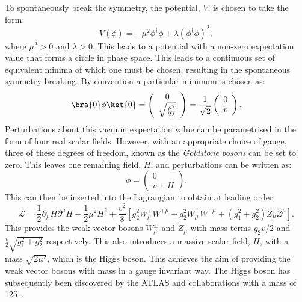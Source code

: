 To spontaneously break the symmetry, the potential, $V$, is chosen to
take the form:
\begin{equation}
\label{eq:higgsPot}
V(\phi)=-\mu^{2}\phi^{\dag}\phi+\lambda\left(\phi^{\dag}\phi\right)^{2},
\end{equation}
where $\mu^2>0$ and $\lambda>0$. This leads to a potential with a
non-zero expectation value that forms a circle in phase space. This
leads to a continuous set of equivalent minima of which one must be
chosen, resulting in the spontaneous symmetry breaking. By convention a
particular minimum is chosen as:
\begin{equation}
\bra{0}\phi\ket{0}=\left(\begin{array}{c} 0 \\ \sqrt{\frac{\mu^{2}}{2\lambda}} \end{array}\right)=\frac{1}{\sqrt{2}}\left(\begin{array}{c} 0 \\ v \end{array}\right).
\end{equation}
Perturbations about this vacuum expectation value can be parametrised
in the form of four real scalar fields. However, with an appropriate
choice of gauge, three of these degrees of freedom, known as the
\emph{Goldstone bosons} can be set to zero. This leaves one remaining
field, $H$, and perturbations can be written as:
\begin{equation}
  \phi=\left(\begin{array}{c}0 \\ v+H \end{array}\right).
\end{equation}
This can then be inserted into the Lagrangian to obtain at leading
order:
\begin{equation}
  \mathcal{L}=\frac{1}{2}\partial_{\mu}H\partial^{\mu}H-\frac{1}{2}\mu^{2}H^{2}+\frac{v^{2}}{8}\left[g_{2}^{2}W_{\mu}^{+}W^{+\mu}+g_{2}^{2}W_{\mu}^{-}W^{-\mu}+\left(g_{1}^{2}+g_{2}^{2}\right)Z_{\mu}Z^{\mu}\right].
\end{equation}
This provides the weak vector bosons $W_{\mu}^{\pm}$ and $Z_{\mu}$
with mass terms $g_2v/2$ and $\frac{v}{2}\sqrt{g_1^2+g_2^2}$
respectively. This also introduces a massive scalar field, $H$, with a
mass $\sqrt{2\mu^2}$, which is the Higgs boson. This achieves the aim of providing
the weak vector bosons with mass in a gauge invariant way. The
Higgs boson has subsequently been discovered by the ATLAS and \CMS
collaborations with a mass of 125~\gev \cite{1207.7214,1207.7235}.

